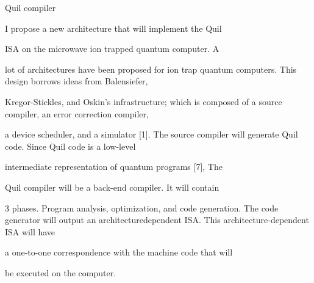 \documentclass[a4paper,portrait,12pt]{article}
\begin{document}
\begin{flushleft}
Quil compiler
\end{flushleft}





\begin{flushleft}
I propose a new architecture that will implement the Quil
\end{flushleft}


\begin{flushleft}
ISA on the microwave ion trapped quantum computer. A
\end{flushleft}


\begin{flushleft}
lot of architectures have been proposed for ion trap quantum computers. This design borrows ideas from Balensiefer,
\end{flushleft}


\begin{flushleft}
Kregor-Stickles, and Oskin's infrastructure; which is composed of a source compiler, an error correction compiler,
\end{flushleft}


\begin{flushleft}
a device scheduler, and a simulator [1]. The source compiler will generate Quil code. Since Quil code is a low-level
\end{flushleft}


\begin{flushleft}
intermediate representation of quantum programs [7], The
\end{flushleft}


\begin{flushleft}
Quil compiler will be a back-end compiler. It will contain
\end{flushleft}


\begin{flushleft}
3 phases. Program analysis, optimization, and code generation. The code generator will output an architecturedependent ISA. This architecture-dependent ISA will have
\end{flushleft}


\begin{flushleft}
a one-to-one correspondence with the machine code that will
\end{flushleft}


\begin{flushleft}
be executed on the computer.
\end{flushleft}
\end{document}
